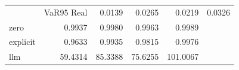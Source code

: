 \begin{tabular}{lrrrr}
\toprule
 & VaR95%
\midrule
Real & 0.0139 & 0.0265 & 0.0219 & 0.0326 \\
zero & 0.9937 & 0.9980 & 0.9963 & 0.9989 \\
explicit & 0.9633 & 0.9935 & 0.9815 & 0.9976 \\
llm & 59.4314 & 85.3388 & 75.6255 & 101.0067 \\
\bottomrule
\end{tabular}
